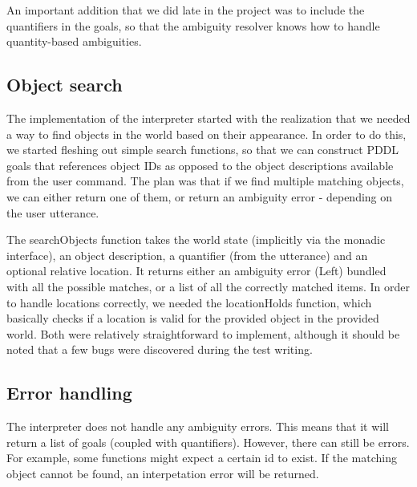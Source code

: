 An important addition that we did late in the project was to include the quantifiers in the goals, so that the ambiguity resolver knows how to handle quantity-based ambiguities.

\subsection*{Object search}
The implementation of the interpreter started with the realization that we needed a way to find objects in the world based on their appearance.
In order to do this, we started fleshing out simple search functions, so that we can construct PDDL goals that references object IDs as opposed to the object descriptions available from the user command.
The plan was that if we find multiple matching objects, we can either return one of them, or return an ambiguity error - depending on the user utterance.

The searchObjects function takes the world state (implicitly via the monadic interface), an object description, a quantifier (from the utterance) and an optional relative location.
It returns either an ambiguity error (Left) bundled with all the possible matches, or a list of all the correctly matched items.
In order to handle locations correctly, we needed the locationHolds function, which basically checks if a location is valid for the provided object in the provided world.
Both were relatively straightforward to implement, although it should be noted that a few bugs were discovered during the test writing.

\subsection*{Error handling}
The interpreter does not handle any ambiguity errors.
This means that it will return a list of goals (coupled with quantifiers).
However, there can still be errors. For example, some functions might expect a certain id to exist.
If the matching object cannot be found, an interpetation error will be returned.

